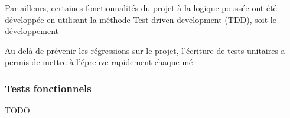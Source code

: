 Par ailleurs, certaines fonctionnalités du projet à la logique poussée ont été développée en utilisant la méthode Test driven development (TDD), soit le développement 

Au delà de prévenir les régressions sur le projet, l'écriture de tests unitaires a permis de mettre à l'épreuve rapidement chaque mé


\subsubsection{Tests fonctionnels}

TODO